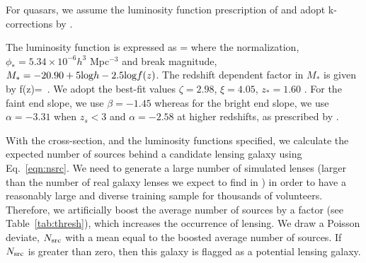 \documentclass[useAMS,usenatbib,a4paper]{mn2e}
\begin{document}
For quasars, we assume the luminosity function prescription of \citet{Oguri2010}
and adopt k-corrections by \citep{Richards2006}.

The luminosity function is expressed as
\be
{}=
\ee
where the normalization, $\phi_{*}=5.34\times10^{-6} h^3$ Mpc$^{-3}$ and break
magnitude, $M_*=-20.90 + 5 {\rm log} h - 2.5 {\rm log} f(z)$. The redshift
dependent factor in $M_*$ is given by
\be
f(z)= \,.
\ee
We adopt the best-fit values $\zeta=2.98$, $\xi=4.05$, $z_{*}=1.60$
\citep{Oguri2010}. For the faint end slope, we use $\beta=-1.45$ whereas for
the bright end slope, we use $\alpha=-3.31$ when $z_s<3$ and $\alpha=-2.58$ at
higher redshifts, as prescribed by \citet{Oguri2010}.

With the cross-section, and the luminosity functions specified, we
calculate the expected number of sources behind a candidate lensing
galaxy using Eq.~\ref{eqn:nsrc}. We need to generate a large number of
simulated lenses (larger than the number of real galaxy lenses we expect
to find in \cfhtls) in order to have a reasonably large and diverse
training sample for thousands of \sw volunteers. Therefore, we
artificially boost the average number of sources by a factor (see
Table~\ref{tab:thresh}), which increases the occurrence of lensing. We
draw a Poisson deviate, $N_{\rm src}$ with a mean equal to the boosted
average number of sources. If $N_{\rm src}$ is greater than zero, then
this galaxy is flagged as a potential lensing galaxy.
\end{document}
